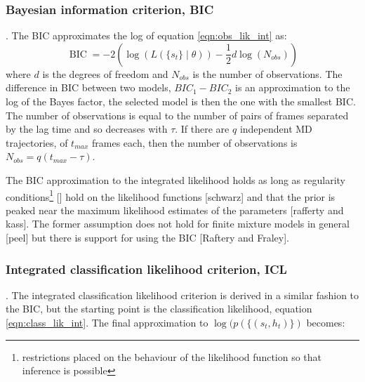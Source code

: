 \subsubsection{Bayesian information criterion, BIC}. \label{sec:bic}
The BIC approximates the log of equation \ref{eqn:obs_lik_int} as:
\begin{equation}\label{eqn:bic}
    \operatorname{BIC} = -2\left(\log{\left(L\left(\{s_t\}\middle|\theta\right)\right)} - \frac{1}{2}d\log{\left(N_{obs}\right)}\right)
\end{equation}
where $d$ is the degrees of freedom and $N_{obs}$ is the number of observations.  The difference in BIC between two models, $BIC_{1}-BIC_{2}$ is an approximation to the log of the Bayes factor, the selected model is then the one with the smallest BIC. The number of observations is equal to the number of pairs of frames separated by the lag time and so decreases with $\tau$. If there are $q$ independent MD trajectories, of $t_{max}$ frames each, then the number of observations is $N_{obs} = q(t_{max}-\tau)$. 

The BIC approximation to the integrated likelihood holds as long as regularity conditions\footnote{restrictions placed on the behaviour of the likelihood function so that inference is possible} [] hold on the likelihood functions [schwarz] and that the prior is peaked near the maximum likelihood estimates of the parameters [rafferty and kass].  The former assumption does not hold for finite mixture models in general [peel] but there is support for using the BIC [Raftery and Fraley].


\subsubsection{Integrated classification likelihood criterion, ICL}. 
The integrated classification likelihood criterion is derived in a  similar fashion to the BIC, but the starting point is the classification likelihood, equation \ref{eqn:class_lik_int}. The final approximation to $\log{(p(\{(s_t, h_t)\})}$ becomes: 

